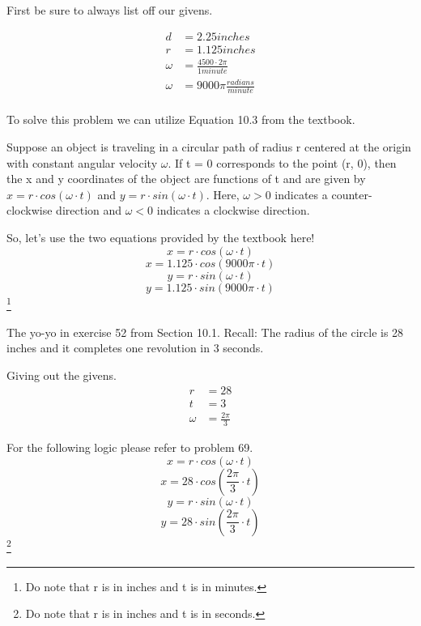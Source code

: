 \documentclass[10pt,letterpaper]{amspset}
\begin{document}
\begin{solution}[Solution]

First be sure to always list off our givens.

\begin{align}
    d &= 2.25 inches \\
    r &= 1.125 inches \\
    \omega &= \frac{4500 \cdot 2\pi}{1 minute} \\
    \omega &= 9000\pi \frac{radians}{minute} \\
\end{align}

To solve this problem we can utilize Equation 10.3 from the textbook. 

\begin{problem}[Equation 10.3]
Suppose an object is traveling in a circular path of radius r centered at the origin with constant angular velocity $\omega$. If t = 0 corresponds to the point (r, 0), then the x and y coordinates of the object are functions of t and are given by $x = r \cdot cos(\omega \cdot t)$ and $y = r \cdot sin(\omega \cdot t)$. Here, $\omega > 0$ indicates a counter-clockwise direction and $\omega < 0$ indicates a clockwise direction.
\end{problem}

\bigskip

So, let's use the two equations provided by the textbook here! 
\[x = r \cdot cos(\omega \cdot t)\]
\[\boxed{x = 1.125 \cdot cos(9000\pi \cdot t)}\]
\[y = r \cdot sin(\omega \cdot t)\]
\[\boxed{y = 1.125 \cdot sin(9000\pi \cdot t)}\]
\footnote{Do note that r is in inches and t is in minutes.}

\end{solution}


\pagebreak


\begin{problem}[70]
The yo-yo in exercise 52 from Section 10.1.
Recall: The radius of the circle is 28 inches and it completes one revolution in 3 seconds.
\end{problem}

\begin{solution}[Solution]
Giving out the givens.
\begin{align}
    r &= 28 \\
    t &= 3 \\
    \omega &= \frac{2\pi}{3}
\end{align}

For the following logic please refer to problem 69.
\[x = r \cdot cos(\omega \cdot t)\]
\[\boxed{x = 28 \cdot cos\left( \frac{2\pi}{3} \cdot t \right)}\]
\[y = r \cdot sin(\omega \cdot t)\]
\[\boxed{y = 28 \cdot sin\left( \frac{2\pi}{3} \cdot t \right)}\]
\footnote{Do note that r is in inches and t is in seconds.}
\end{solution}
\end{document}
